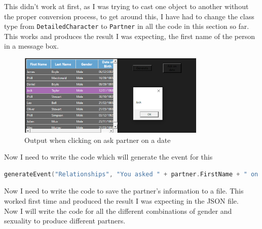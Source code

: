 This didn't work at first, as I was trying to cast one object to another without the proper conversion process, to get around this, I have had to change the class type from \verb|DetailedCharacter| to \verb|Partner| in all the code in this section so far.\\
This works and produces the result I was expecting, the first name of the person in a message box.
\begin{figure}[H]
    \centering
    \includegraphics[width=0.8\textwidth]{images/implementation/partners5.png}
    \caption{Output when clicking on ask partner on a date}
    \label{fig:implementation-partners5}
\end{figure}
\noindent Now I need to write the code which will generate the event for this
\begin{lstlisting}[language=c, style=csharp, caption=Code to create event saying that you have a new partner]
generateEvent("Relationships", "You asked " + partner.FirstName + " on a date and they said yes!", controlClass.InGameDate);
\end{lstlisting}
Now I need to write the code to save the partner's information to a file. This worked first time and produced the result I was expecting in the JSON file.\\
Now I will write the code for all the different combinations of gender and sexuality to produce different partners.
